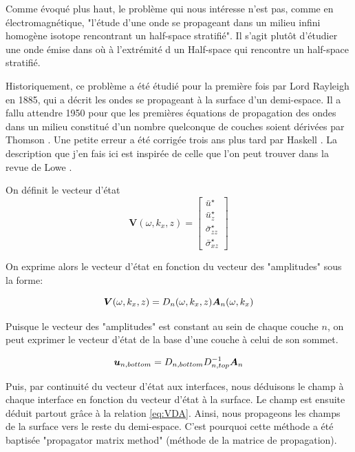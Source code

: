 Comme évoqué plus haut, le problème qui nous intéresse n'est pas, comme en électromagnétique, "l'étude d'une onde se propageant dans un milieu infini homogène isotope rencontrant un half-space stratifié". Il s'agit plutôt d'étudier une onde émise dans où à l'extrémité d un Half-space qui rencontre un half-space stratifié. \par 

Historiquement, ce problème a été étudié pour la première fois par Lord Rayleigh \cite{Rayleigh} en 1885, qui a décrit les ondes se propageant à la surface d'un demi-espace. Il a fallu attendre 1950 pour que les premières équations de propagation des ondes dans un milieu constitué d'un nombre quelconque de couches soient dérivées par Thomson \cite{Tomson}. Une petite erreur a été corrigée trois ans plus tard par Haskell \cite{Haskell}. La description que j'en fais ici est inspirée de celle que l'on peut trouver dans la revue de Lowe \cite{Lowe_review}.\par

On définit le vecteur d'état 
$$ \bm{V}(\omega,k_x,z) = \begin{bmatrix} \bar{u}^\star \\ \bar{u}^\star_z \\ \bar{\sigma}^\star_{zz} \\ \bar{\sigma}^\star_{xz}  \end{bmatrix}$$

On exprime alors le vecteur d'état en fonction du vecteur des "amplitudes" sous la forme:

\begin{equation}
    \bm{V}(\omega,k_x,z) = D_n(\omega,k_x,z) \bm{A}_n(\omega,k_x)
    \label{eq:VDA}
\end{equation}

Puisque le vecteur des "amplitudes" est constant au sein de chaque couche $n$, on peut exprimer le vecteur d'état de la base d'une couche à celui de son sommet.

\begin{equation*}
    \bm{u}_{n,bottom} = D_{n,bottom} D_{n,top}^{-1} \bm{A}_n
\end{equation*}

Puis, par continuité du vecteur d'état aux interfaces, nous déduisons le champ à chaque interface en fonction du vecteur d'état à la surface. Le champ est ensuite déduit partout grâce à la relation \eqref{eq:VDA}. Ainsi, nous propageons les champs de la surface vers le reste du demi-espace. C'est pourquoi cette méthode a été baptisée "propagator matrix method" (méthode de la matrice de propagation).\par 

